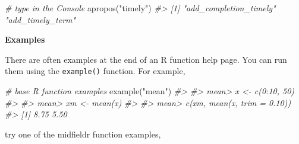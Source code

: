 \documentclass[
]{book}
\newenvironment{Shaded}{\begin{snugshade}}{\end{snugshade}}
\newcommand{\CommentTok}[1]{\textcolor[rgb]{0.56,0.35,0.01}{\textit{#1}}}
\newcommand{\FunctionTok}[1]{\textcolor[rgb]{0.00,0.00,0.00}{#1}}
\newcommand{\NormalTok}[1]{#1}
\newcommand{\StringTok}[1]{\textcolor[rgb]{0.31,0.60,0.02}{#1}}
\begin{document}
\begin{Shaded}
\begin{Highlighting}[]
\CommentTok{\# type in the Console}
\FunctionTok{apropos}\NormalTok{(}\StringTok{"timely"}\NormalTok{)}
\CommentTok{\#\textgreater{} [1] "add\_completion\_timely" "add\_timely\_term"}
\end{Highlighting}
\end{Shaded}

\textbf{Examples}

There are often examples at the end of an R function help page. You can run them using the \texttt{example()} function. For example,

\begin{Shaded}
\begin{Highlighting}[]
\CommentTok{\# base R function examples}
\FunctionTok{example}\NormalTok{(}\StringTok{"mean"}\NormalTok{)}
\CommentTok{\#\textgreater{} }
\CommentTok{\#\textgreater{} mean\textgreater{} x \textless{}{-} c(0:10, 50)}
\CommentTok{\#\textgreater{} }
\CommentTok{\#\textgreater{} mean\textgreater{} xm \textless{}{-} mean(x)}
\CommentTok{\#\textgreater{} }
\CommentTok{\#\textgreater{} mean\textgreater{} c(xm, mean(x, trim = 0.10))}
\CommentTok{\#\textgreater{} [1] 8.75 5.50}
\end{Highlighting}
\end{Shaded}

try one of the midfieldr function examples,
\end{document}
